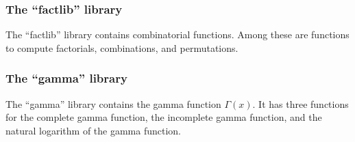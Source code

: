 \subsubsection{The ``factlib'' library}
\label{sec:factlib}
The ``factlib'' library contains combinatorial functions.   Among these are
functions to compute factorials, combinations, and permutations.

\subsubsection{The ``gamma'' library}
\label{sec:gamma}
The ``gamma'' library contains the gamma function $\Gamma(x)$.   It has three
functions for the complete gamma function, the incomplete gamma function,
and the natural logarithm of the gamma function.


